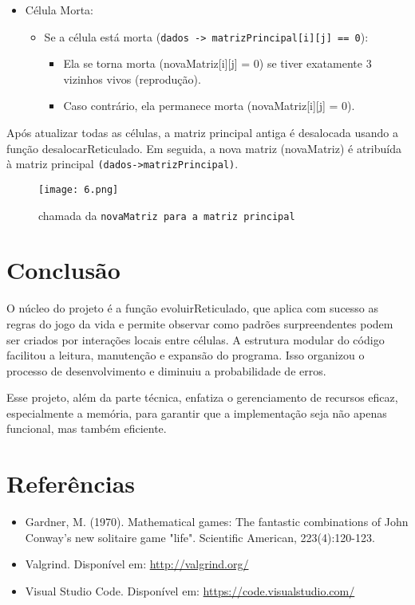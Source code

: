 \documentclass[a4paper,12pt]{article}
\begin{document}
\begin{itemize}
    \item Célula Morta:
        \begin{itemize}
             \item Se a célula está morta (\texttt{dados -> matrizPrincipal[i][j] == 0}):
                \begin{itemize}
                    \item Ela se torna morta (novaMatriz[i][j] = 0) se tiver exatamente 3 vizinhos vivos (reprodução).
                    \item Caso contrário, ela permanece morta (novaMatriz[i][j] = 0).
                \end{itemize}
        \end{itemize}
\end{itemize}

Após atualizar todas as células, a matriz principal antiga é desalocada usando a função desalocarReticulado. Em seguida, a nova matriz (novaMatriz) é atribuída à matriz principal \texttt{(dados->matrizPrincipal)}.

\begin{figure}[H]
        \centering
        \texttt{[image: 6.png]}
        \caption{chamada da \texttt{novaMatriz para a matriz principal}}
        \label{fig:enter-label15}
\end{figure}

\section{Conclusão}
O núcleo do projeto é a função evoluirReticulado, que aplica com sucesso as regras do jogo da vida e permite observar como padrões surpreendentes podem ser criados por interações locais entre células. A estrutura modular do código facilitou a leitura, manutenção e expansão do programa. Isso organizou o processo de desenvolvimento e diminuiu a probabilidade de erros.

Esse projeto, além da parte técnica, enfatiza o gerenciamento de recursos eficaz, especialmente a memória, para garantir que a implementação seja não apenas funcional, mas também eficiente.

\section{Referências}
\begin{itemize}

    \item Gardner, M. (1970). Mathematical games: The fantastic combinations of John Conway's new solitaire game "life". Scientific American, 223(4):120-123.
    \item Valgrind. Disponível em: \url{http://valgrind.org/}
    \item Visual Studio Code. Disponível em: \url{https://code.visualstudio.com/}
    
\end{itemize}
\end{document}
